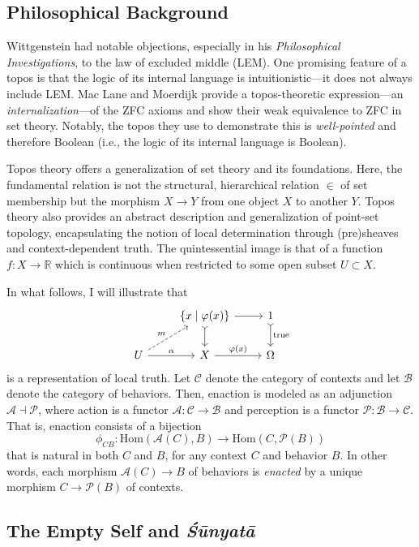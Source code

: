 \documentclass{article}
\begin{document}
\subsection{Philosophical Background}

Wittgenstein had notable objections, especially in his \emph{Philosophical Investigations}, to the law of excluded middle (LEM). One promising feature of a topos is that the logic of its internal language is intuitionistic---it does not always include LEM. Mac Lane and Moerdijk provide a topos-theoretic expression---an \emph{internalization}---of the ZFC axioms and show their weak equivalence to ZFC in set theory. Notably, the topos they use to demonstrate this is \emph{well-pointed} and therefore Boolean (i.e., the logic of its internal language is Boolean).

Topos theory offers a generalization of set theory and its foundations. Here, the fundamental relation is not the structural, hierarchical relation $\in$ of set membership but the morphism $X \to Y$ from one object $X$ to another $Y$. Topos theory also provides an abstract description and generalization of point-set topology, encapsulating the notion of local determination through (pre)sheaves and context-dependent truth. The quintessential image is that of a function $f \colon X \to \mathbb{R}$ which is continuous when restricted to some open subset $U \subset X$.

In what follows, I will illustrate that  
\[
\begin{tikzcd}
& \{ x \mid \varphi(x) \}  \arrow[r] \arrow[d, tail] & 1 \arrow[d, tail, "\text{true}"] \\
U \arrow[r, "\alpha"] \arrow[ru, dashed, "m"] & X \arrow[r, "\varphi(x)"] & \Omega
\end{tikzcd}
\]
is a representation of local truth. Let $\mathcal{C}$ denote the category of contexts and let $\mathcal{B}$ denote the category of behaviors. Then, enaction is modeled as an adjunction $\mathcal{A} \dashv \mathcal{P}$, where action is a functor $\mathcal{A} \colon \mathcal{C} \to \mathcal{B}$ and perception is a functor $\mathcal{P} \colon \mathcal{B} \to \mathcal{C}$. That is, enaction consists of a bijection 
\[
\phi_{CB} \colon \text{Hom} ( \mathcal{A}(C), B ) \to \text{Hom}(C, \mathcal{P}(B))
\]
that is natural in both $C$ and $B$, for any context $C$ and behavior $B$. In other words, each morphism $\mathcal{A}(C) \to B$ of behaviors is \emph{enacted} by a unique morphism $C \to \mathcal{P}(B)$ of contexts.

\subsection{The Empty Self and \emph{Śūnyatā}} \label{sec:self}
\end{document}
